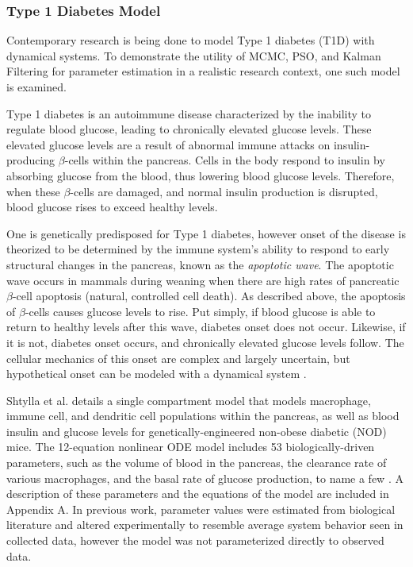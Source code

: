 \subsubsection{Type 1 Diabetes Model} \label{Type1_Diabetes_System}
Contemporary research is being done to model Type 1 diabetes (T1D) with dynamical systems. To demonstrate the utility of MCMC, PSO, and Kalman Filtering for parameter estimation in a realistic research context, one such model is examined.
\par Type 1 diabetes is an autoimmune disease characterized by the inability to regulate blood glucose, leading to chronically elevated glucose levels. These elevated glucose levels are a result of abnormal immune attacks on insulin-producing $\beta$-cells within the pancreas. Cells in the body respond to insulin by absorbing glucose from the blood, thus lowering blood glucose levels. Therefore, when these $\beta$-cells are damaged, and normal insulin production is disrupted, blood glucose rises to exceed healthy levels. 
\par One is genetically predisposed for Type 1 diabetes, however onset of the disease is theorized to be determined by the immune system's ability to respond to early structural changes in the pancreas, known as the \emph{apoptotic wave}. The apoptotic wave occurs in mammals during weaning when there are high rates of pancreatic $\beta$-cell apoptosis (natural, controlled cell death). As described above, the apoptosis of $\beta$-cells causes glucose levels to rise. Put simply, if blood glucose is able to return to healthy levels after this wave, diabetes onset does not occur. Likewise, if it is not, diabetes onset occurs, and chronically elevated glucose levels follow. The cellular mechanics of this onset are complex and largely uncertain, but hypothetical onset can be modeled with a dynamical system \cite{shtylla2019mathematical}.
\par Shtylla et al. details a single compartment model that models macrophage, immune cell, and dendritic cell populations within the pancreas, as well as blood insulin and glucose levels for genetically-engineered non-obese diabetic (NOD) mice. The 12-equation nonlinear ODE model includes 53 biologically-driven parameters, such as the volume of blood in the pancreas, the clearance rate of various macrophages, and the basal rate of glucose production, to name a few \cite{shtylla2019mathematical}. A description of these parameters and the equations of the model are included in Appendix A. In previous work, parameter values were estimated from biological literature and altered experimentally to resemble average system behavior seen in collected data, however the model was not parameterized directly to observed data.

